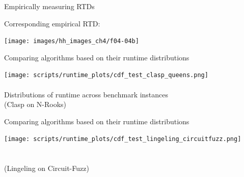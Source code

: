 \begin{frame}[c]{Empirically measuring RTDs}


Corresponding empirical RTD:

\begin{center}
\hspace*{-13mm}
\texttt{[image: images/hh\_images\_ch4/f04-04b]}
\end{center}

\end{frame}
\begin{frame}[c]{Comparing algorithms based on their runtime distributions}

\begin{center}
\texttt{[image: scripts/runtime\_plots/cdf\_test\_clasp\_queens.png]}\\~\\
\vspace*{-0.3cm}
Distributions of runtime \alert{across benchmark instances}\\
(Clasp on N-Rooks) %
\end{center}

\end{frame}

\begin{frame}[c]{Comparing algorithms based on their runtime distributions}

\begin{center}
\texttt{[image: scripts/runtime\_plots/cdf\_test\_lingeling\_circuitfuzz.png]}\\~\\
\vspace*{-0.3cm}
~\\
(Lingeling on Circuit-Fuzz) %
\end{center}

\end{frame}




